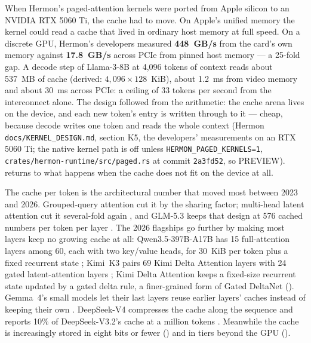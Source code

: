 
When Hermon's paged-attention kernels were ported from Apple silicon to an
NVIDIA RTX 5060 Ti, the cache had to move. On Apple's unified memory the
kernel could read a cache that lived in ordinary host memory at full speed. On
a discrete GPU, Hermon's developers measured \textbf{448~GB/s} from the card's
own memory against \textbf{17.8~GB/s} across PCIe from pinned host memory ---
a 25-fold gap. A decode step of Llama-3-8B at 4,096 tokens of context reads
about 537~MB of cache (derived: $4{,}096\times128$~KiB), about 1.2~ms from
video memory and about 30~ms across PCIe: a ceiling of 33 tokens per second
from the interconnect alone. The design followed from the arithmetic: the
cache arena lives on the device, and each new token's entry is written through
to it --- cheap, because decode writes one token and reads the whole context
(Hermon \texttt{docs/KERNEL\_DESIGN.md}, section K5, the developers'
measurements on an RTX 5060 Ti; the native kernel path is off unless
\texttt{HERMON\_PAGED\_KERNELS=1}, \texttt{crates/hermon-runtime/src/paged.rs}
at commit \texttt{2a3fd52}, so PREVIEW).  returns to what happens when the cache
does not fit on the device at all.


The cache per token is the architectural number that moved most between 2023
and 2026. Grouped-query attention cut it by the sharing factor; multi-head
latent attention cut it several-fold again \cite{deepseek2024v2,deepseek2024v3},
and GLM-5.3 keeps that design at 576 cached numbers per token per layer
\cite{zai2026glm53}. The 2026 flagships go further by making most layers keep no
growing cache at all: Qwen3.5-397B-A17B has 15 full-attention layers among 60,
each with two key/value heads, for 30~KiB per token plus a fixed recurrent state
\cite{qwen2026qwen35config}; Kimi~K3 pairs 69 Kimi Delta Attention layers
with 24 gated latent-attention layers \cite{moonshot2026kimik3}; Kimi Delta
Attention keeps a fixed-size recurrent state updated by a gated delta rule, a
finer-grained form of Gated DeltaNet \cite{kimi2025linear} ().
Gemma~4's small models let their last layers reuse earlier layers' caches
instead of keeping their own \cite{google2026gemma4}. DeepSeek-V4 compresses
the cache along the sequence and reports 10\% of DeepSeek-V3.2's cache at a
million tokens \cite{deepseek2026v4}. Meanwhile the cache is increasingly
stored in eight bits or fewer () and in tiers beyond the
GPU ().

